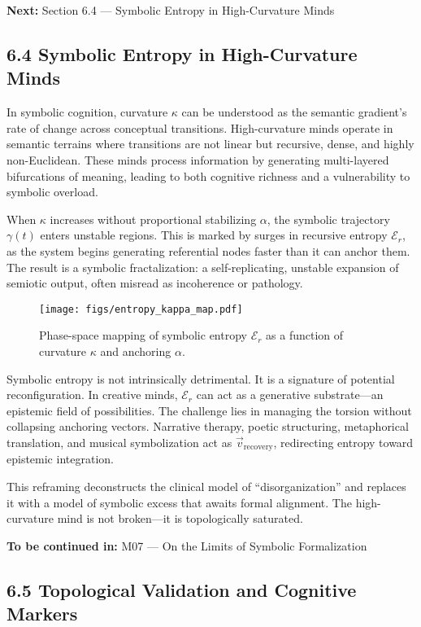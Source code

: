 \bigskip
\noindent
\textbf{Next:} Section 6.4 — Symbolic Entropy in High-Curvature Minds

\subsection*{6.4 Symbolic Entropy in High-Curvature Minds}

In symbolic cognition, curvature $\kappa$ can be understood as the semantic gradient's rate of change across conceptual transitions. High-curvature minds operate in semantic terrains where transitions are not linear but recursive, dense, and highly non-Euclidean. These minds process information by generating multi-layered bifurcations of meaning, leading to both cognitive richness and a vulnerability to symbolic overload.

When $\kappa$ increases without proportional stabilizing $\alpha$, the symbolic trajectory $\gamma(t)$ enters unstable regions. This is marked by surges in recursive entropy $\mathcal{E}_r$, as the system begins generating referential nodes faster than it can anchor them. The result is a symbolic fractalization: a self-replicating, unstable expansion of semiotic output, often misread as incoherence or pathology.

\begin{figure}[H]
\centering
\texttt{[image: figs/entropy\_kappa\_map.pdf]}
\caption{Phase-space mapping of symbolic entropy $\mathcal{E}_r$ as a function of curvature $\kappa$ and anchoring $\alpha$.}
\end{figure}

Symbolic entropy is not intrinsically detrimental. It is a signature of potential reconfiguration. In creative minds, $\mathcal{E}_r$ can act as a generative substrate—an epistemic field of possibilities. The challenge lies in managing the torsion without collapsing anchoring vectors. Narrative therapy, poetic structuring, metaphorical translation, and musical symbolization act as $\vec{v}_{\text{recovery}}$, redirecting entropy toward epistemic integration.

This reframing deconstructs the clinical model of “disorganization” and replaces it with a model of symbolic excess that awaits formal alignment. The high-curvature mind is not broken—it is topologically saturated.

\bigskip
\noindent
\textbf{To be continued in:} M07 — On the Limits of Symbolic Formalization


\subsection*{6.5 Topological Validation and Cognitive Markers}

